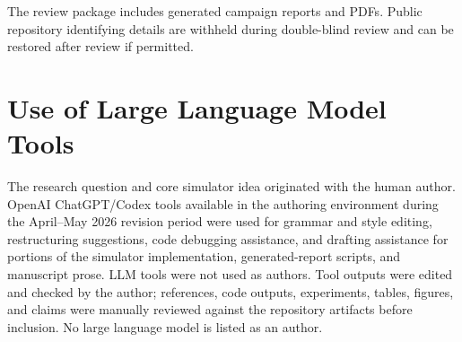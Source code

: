 \documentclass[manuscript]{acmart}
\begin{document}
The review package includes generated campaign reports and PDFs. Public repository identifying details are withheld during double-blind review and can be restored after review if permitted.

\section*{Use of Large Language Model Tools}

The research question and core simulator idea originated with the human author. OpenAI ChatGPT/Codex tools available in the authoring environment during the April--May 2026 revision period were used for grammar and style editing, restructuring suggestions, code debugging assistance, and drafting assistance for portions of the simulator implementation, generated-report scripts, and manuscript prose. LLM tools were not used as authors. Tool outputs were edited and checked by the author; references, code outputs, experiments, tables, figures, and claims were manually reviewed against the repository artifacts before inclusion. No large language model is listed as an author.



\end{document}

